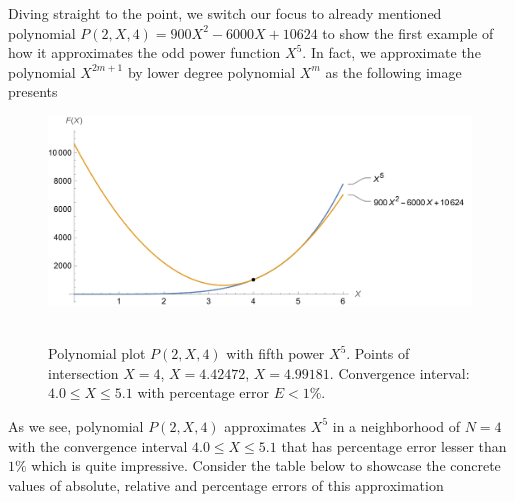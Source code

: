 Diving straight to the point, we switch our focus to already mentioned polynomial $P(2,X,4) = 900X^2 - 6000X + 10624$
to show the first example of how it approximates the odd power function $X^5$.
In fact, we approximate the polynomial $X^{2m+1}$ by lower degree polynomial $X^m$ as the following image presents
\begin{figure}[H]
    \centering
    \includegraphics[width=1\textwidth]{sections/images/03_plots_polynomial_p2_n4_with_fifth}
    ~\caption{Polynomial plot $P(2, X, 4)$ with fifth power $X^5$.
    Points of intersection $X=4$, $X=4.42472$, $X=4.99181$.
    Convergence interval: $4.0 \leq X \leq 5.1$ with percentage error $E < 1\%$.
    }\label{fig:03_plots_polynomial_p2_n4_with_fifth}
\end{figure}
As we see, polynomial $P(2, X, 4)$ approximates $X^5$ in a neighborhood of $N=4$ with
the convergence interval $4.0 \leq X \leq 5.1$ that has percentage error lesser than $1\%$ which is quite impressive.
Consider the table below to showcase the concrete values of absolute, relative and percentage errors of this approximation


